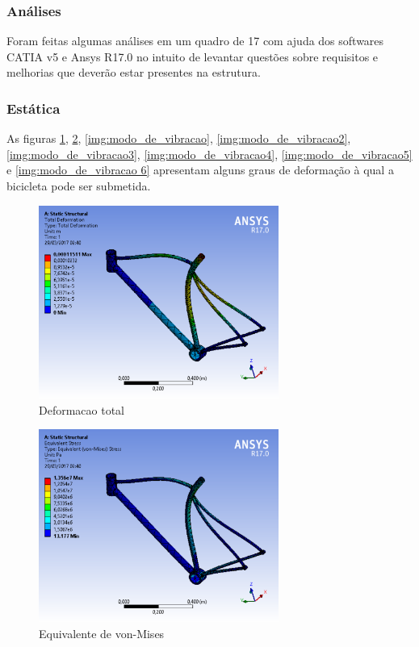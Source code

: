 \newpage

	\subsubsection{Análises}
	Foram feitas algumas análises em um quadro de 17 com ajuda dos softwares CATIA v5 e Ansys R17.0 no intuito de levantar questões sobre requisitos e melhorias que deverão estar presentes na estrutura.
	
	\subsubsection{Estática}
	As figuras \ref{img:deformacao_total}, \ref{img:equivalente_de_von_mises}, \ref{img:modo_de_vibracao}, \ref{img:modo_de_vibracao2}, \ref{img:modo_de_vibracao3}, \ref{img:modo_de_vibracao4}, \ref{img:modo_de_vibracao5} e \ref{img:modo_de_vibracao 6} apresentam alguns graus de deformação à qual a bicicleta pode ser submetida. 	
	
		\graphicspath{{figuras/}}
			\begin{figure}[h!]
			\centering
			\includegraphics[width=0.7\textwidth]{deformacao_total.png}
			\caption{Deformacao total}
			\label{img:deformacao_total}
			\end{figure}	
			
		\graphicspath{{figuras/}}
			\begin{figure}[h!]
			\centering
			\includegraphics[width=0.7\textwidth]{equivalente_de_von_mises.png}
			\caption{Equivalente de von-Mises}
			\label{img:equivalente_de_von_mises}
			\end{figure}	
			
